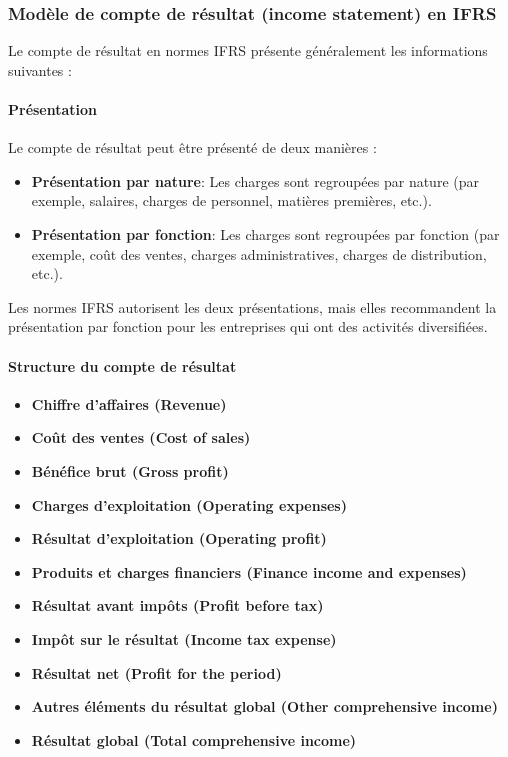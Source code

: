 \documentclass[a4paper, 12pt]{report}
\begin{document}
\subsubsection{Modèle de compte de résultat (income statement) en IFRS}

Le compte de résultat en normes IFRS présente généralement les informations suivantes :

\paragraph{Présentation}

Le compte de résultat peut être présenté de deux manières :

\begin{itemize}
	\item \textbf{Présentation par nature}: Les charges sont regroupées par nature (par exemple, salaires, charges de personnel, matières premières, etc.).
	\item \textbf{Présentation par fonction}: Les charges sont regroupées par fonction (par exemple, coût des ventes, charges administratives, charges de distribution, etc.).
\end{itemize}

Les normes IFRS autorisent les deux présentations, mais elles recommandent la présentation par fonction pour les entreprises qui ont des activités diversifiées.

\paragraph{Structure du compte de résultat}

\begin{itemize}
	\item \textbf{Chiffre d'affaires (Revenue)}
	\item \textbf{Coût des ventes (Cost of sales)}
	\item \textbf{Bénéfice brut (Gross profit)}
	\item \textbf{Charges d'exploitation (Operating expenses)}
	\item \textbf{Résultat d'exploitation (Operating profit)}
	\item \textbf{Produits et charges financiers (Finance income and expenses)}
	\item \textbf{Résultat avant impôts (Profit before tax)}
	\item \textbf{Impôt sur le résultat (Income tax expense)}
	\item \textbf{Résultat net (Profit for the period)}
	\item \textbf{Autres éléments du résultat global (Other comprehensive income)}
	\item \textbf{Résultat global (Total comprehensive income)}
\end{itemize}
\end{document}
